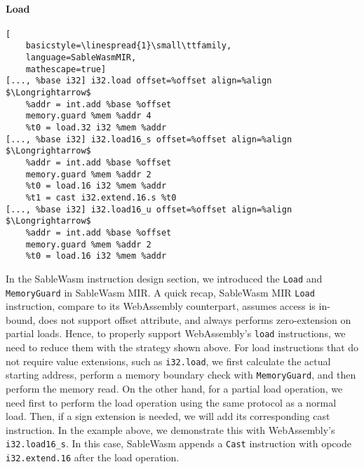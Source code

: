 \paragraph{Load} \quad
\begin{lstlisting}[
    basicstyle=\linespread{1}\small\ttfamily, 
    language=SableWasmMIR, 
    mathescape=true]
[..., %base i32] i32.load offset=%offset align=%align $\Longrightarrow$
    %addr = int.add %base %offset
    memory.guard %mem %addr 4
    %t0 = load.32 i32 %mem %addr
[..., %base i32] i32.load16_s offset=%offset align=%align $\Longrightarrow$
    %addr = int.add %base %offset
    memory.guard %mem %addr 2
    %t0 = load.16 i32 %mem %addr
    %t1 = cast i32.extend.16.s %t0
[..., %base i32] i32.load16_u offset=%offset align=%align $\Longrightarrow$
    %addr = int.add %base %offset
    memory.guard %mem %addr 2
    %t0 = load.16 i32 %mem %addr
\end{lstlisting}
In the SableWasm instruction design section, we introduced the \texttt{Load} and
\texttt{MemoryGuard} in SableWasm MIR. A quick recap, SableWasm MIR
\texttt{Load} instruction, compare to its WebAssembly counterpart, assumes
access is in-bound, does not support offset attribute, and always performs
zero-extension on partial loads. Hence, to properly support WebAssembly's
\texttt{load} instructions, we need to reduce them with the strategy shown
above. For load instructions that do not require value extensions, such as
\texttt{i32.load}, we first calculate the actual starting address, perform a
memory boundary check with \texttt{MemoryGuard}, and then perform the memory
read. On the other hand, for a partial load operation, we need first to perform
the load operation using the same protocol as a normal load. Then, if a sign
extension is needed, we will add its corresponding cast instruction. In the
example above, we demonstrate this with WebAssembly's \texttt{i32.load16\_s}.
In this case, SableWasm appends a \texttt{Cast} instruction with opcode
\texttt{i32.extend.16} after the load operation.

